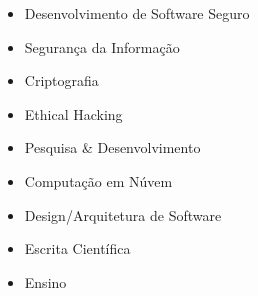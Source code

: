 


    \sidedivider


    \sidedivider



    \smallskip
    \smallskip
    \smallskip

\smallskip
{}

    \begin{itemize}
        \item Desenvolvimento de Software Seguro
        \item Segurança da Informação
        \item Criptografia
        \item Ethical Hacking
        \item Pesquisa \& Desenvolvimento
        \item Computação em Núvem
        \item Design/Arquitetura de Software
        \item Escrita Científica
        \item Ensino
    \end{itemize}


